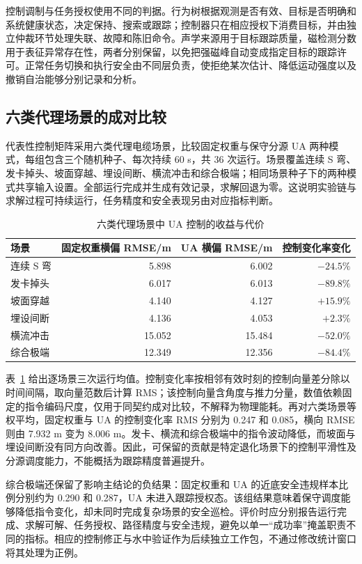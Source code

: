 控制调制与任务授权使用不同的判据。行为树根据观测是否有效、目标是否明确和系统健康状态，决定保持、搜索或跟踪；控制器只在相应授权下消费目标，并由独立仲裁环节处理失联、故障和陈旧命令。声学来源用于目标跟踪质量，磁检测分数用于表征异常存在性，两者分别保留，以免把强磁峰自动变成指定目标的跟踪许可。正常任务切换和执行安全由不同层负责，使拒绝某次估计、降低运动强度以及撤销自治能够分别记录和分析。

\subsection{六类代理场景的成对比较}

代表性控制矩阵采用六类代理电缆场景，比较固定权重与保守分源 UA 两种模式，每组包含三个随机种子、每次持续 60 s，共 36 次运行。场景覆盖连续 S 弯、发卡掉头、坡面穿越、埋设间断、横流冲击和综合极端；相同场景种子下的两种模式共享输入设置。全部运行完成并生成有效记录，求解回退为零。这说明实验链与求解过程可持续运行，任务精度和安全表现另由对应指标判断。

\begin{table}[htbp]
\centering
\caption{六类代理场景中 UA 控制的收益与代价}\label{tab:middle-control-results}
\begin{tabular}{@{}lrrr@{}}
\toprule
场景 & 固定权重横偏 RMSE/m & UA 横偏 RMSE/m & 控制变化率变化 \\
\midrule
连续 S 弯 & 5.898 & 6.002 & $-24.5\%$ \\
发卡掉头 & 6.017 & 6.013 & $-89.8\%$ \\
坡面穿越 & 4.140 & 4.127 & $+15.9\%$ \\
埋设间断 & 4.136 & 4.053 & $+2.3\%$ \\
横流冲击 & 15.052 & 15.484 & $-52.0\%$ \\
综合极端 & 12.349 & 12.356 & $-84.4\%$ \\
\bottomrule
\end{tabular}
\end{table}

表~\ref{tab:middle-control-results} 给出逐场景三次运行均值。控制变化率按相邻有效时刻的控制向量差分除以时间间隔，取向量范数后计算 RMS；该控制向量含角度与推力分量，数值依赖固定的指令编码尺度，仅用于同契约成对比较，不解释为物理能耗。再对六类场景等权平均，固定权重与 UA 的控制变化率 RMS 分别为 0.247 和 0.085，横向 RMSE 则由 7.932 m 变为 8.006 m。发卡、横流和综合极端中的指令波动降低，而坡面与埋设间断没有同方向改善。因此，可保留的贡献是特定退化场景下的控制平滑性及分源调度能力，不能概括为跟踪精度普遍提升。

综合极端还保留了影响主结论的负结果：固定权重和 UA 的近底安全违规样本比例分别约为 0.290 和 0.287，UA 未进入跟踪授权态。该组结果意味着保守调度能够降低指令变化，却未同时完成复杂场景的安全巡检。评价时应分别报告运行完成、求解可解、任务授权、路径精度与安全违规，避免以单一“成功率”掩盖职责不同的指标。相应的控制修正与水中验证作为后续独立工作包，不通过修改统计窗口将其处理为正例。

